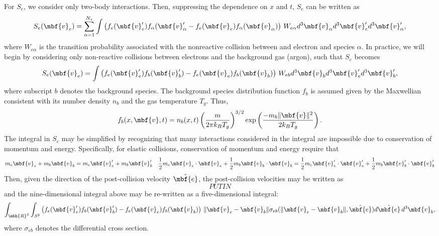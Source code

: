For $S_e$, we consider only two-body interactions.  Then, suppressing
the dependence on $x$ and $t$, $S_e$ can be written as
%
\begin{equation*}
S_e(\mbf{v}_e)
=
\sum_{\alpha=1}^{N_s}
\int \left(
f_e(\mbf{v}_e^{\prime}) f_{\alpha}(\mbf{v}_{\alpha}^{\prime}
-
f_e(\mbf{v}_e) f_{\alpha}(\mbf{v}_{\alpha})
\right) \,
W_{e \alpha}
d^3 \mbf{v}_{\alpha} d^3 \mbf{v}_e^{\prime} d^3 \mbf{v}_{\alpha}^{\prime},
\end{equation*}
%
where $W_{e \alpha}$ is the transition probability associated with the
nonreactive collision between and electron and species $\alpha$.  In
practice, we will begin by considering only non-reactive collisions
between electrons and the background gas (argon), such that $S_e$ becomes
%
\begin{equation*}
S_e (\mbf{v}_e)
=
\int \left(
f_e(\mbf{v}_e^{\prime}) f_{b}(\mbf{v}_{b}^{\prime})
-
f_e(\mbf{v}_e) f_{b}(\mbf{v}_{b})
\right) \,
W_{e b}
d^3 \mbf{v}_{b} d^3 \mbf{v}_e^{\prime} d^3 \mbf{v}_{b}^{\prime},
\end{equation*}
%
where subscript $b$ denotes the background species.  The background
species distribution function $f_b$ is assumed given by the Maxwellian
consistent with its number density $n_b$ and the gas temperature
$T_g$.  Thus,
%
\begin{equation*}
f_b(x, \mbf{v}, t)
=
n_b(x,t)
\left( \frac{m}{2 \pi k_B T_g} \right)^{3/2} 
\exp \left( \frac{-m_b \|\mbf{v}\|^2}{2 k_B T_g} \right).
\end{equation*}
%
The integral in $S_e$ may be simplified by recognizing that many
interactions considered in the integral are impossible due to
conservation of momentum and energy.  Specifically, for elastic
collisions, conservation of momentum and energy require that
%
\begin{equation*}
m_e \mbf{v}_e + m_b \mbf{v}_b
=
m_e \mbf{v}_e^{\prime} + m_b \mbf{v}_b^{\prime}
\quad
\frac{1}{2} m_e \mbf{v}_e \cdot \mbf{v}_e +
\frac{1}{2} m_b \mbf{v}_b \cdot \mbf{v}_b
=
\frac{1}{2} m_e \mbf{v}_e^{\prime} \cdot \mbf{v}_e^{\prime} + 
\frac{1}{2} m_b \mbf{v}_b^{\prime} \cdot \mbf{v}_b^{\prime}
\end{equation*}
%
Then, given the direction of the post-collision velocity
$\hat{\mbf{e}}$, the post-collision velocities may be written as
%
\begin{equation*}
PUT IN
\end{equation*}
%
and the nine-dimensional integral above may be re-written as a
five-dimensional integral:
%
\begin{equation*}
\int_{\mbb{R}^3} \int_{S^2} 
\left(
f_e(\mbf{v}_e^{\prime}) f_{b}(\mbf{v}_{b}^{\prime})
-
f_e(\mbf{v}_e) f_{b}(\mbf{v}_{b})
\right) \,
\|\mbf{v}_e - \mbf{v}_b\| \sigma_{eb}(\|\mbf{v}_e - \mbf{v}_b\|, \hat{\mbf{e}})
d\hat{\mbf{e}} \, d^3 \mbf{v}_{b},
\end{equation*}
%
where $\sigma_{eb}$ denotes the differential cross section.


